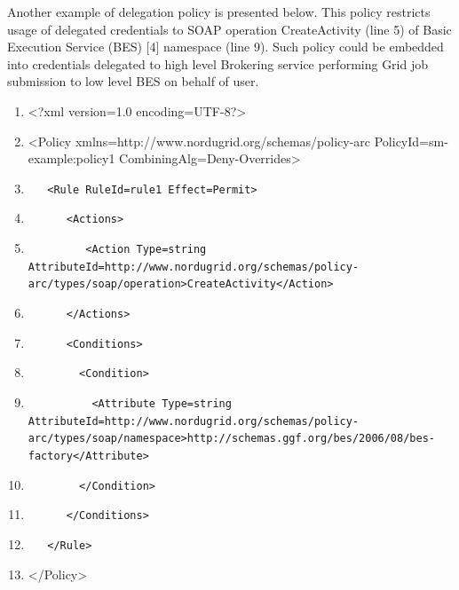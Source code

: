 \documentclass{article}
\newcommand\liststyleWWviiiNumxvi{%
\renewcommand\theenumi{\arabic{enumi}}
\renewcommand\theenumii{\arabic{enumii}}
\renewcommand\theenumiii{\arabic{enumiii}}
\renewcommand\theenumiv{\arabic{enumiv}}
\renewcommand\labelenumi{\theenumi.}
\renewcommand\labelenumii{\theenumii.}
\renewcommand\labelenumiii{\theenumiii.}
\renewcommand\labelenumiv{\theenumiv.}
}
\begin{document}
{\color{black}
Another example of delegation policy is presented below. This policy
restricts usage of delegated credentials to SOAP operation
CreateActivity (line 5) of Basic Execution Service (BES) [4] namespace
(line 9). Such policy could be embedded into credentials delegated to
high level Brokering service performing Grid job submission to low
level BES on behalf of user.}

\liststyleWWviiiNumxvi
\begin{enumerate}
\item {\ttfamily\color{black}
{\textless}?xml version={\textquotedbl}1.0{\textquotedbl}
encoding={\textquotedbl}UTF-8{\textquotedbl}?{\textgreater}}
\item {\ttfamily\color{black}
{\textless}Policy
xmlns={\textquotedbl}http://www.nordugrid.org/schemas/policy-arc{\textquotedbl}
PolicyId={\textquotedbl}sm-example:policy1{\textquotedbl}
CombiningAlg={\textquotedbl}Deny-Overrides{\textquotedbl}{\textgreater}}
\item {\color{black}
\texttt{\ \ \ {\textless}Rule RuleId={\textquotedbl}rule1{\textquotedbl}
Effect={\textquotedbl}Permit{\textquotedbl}{\textgreater}}}
\item {\color{black}
\texttt{\ \ \ \ \ \ {\textless}Actions{\textgreater}}}
\item {\color{black}
\texttt{\ \ \ \ \ \ \ \ \ {\textless}Action
Type={\textquotedbl}string{\textquotedbl}
AttributeId={\textquotedbl}http://www.nordugrid.org/schemas/policy-arc/types/soap/operation{\textquotedbl}{\textgreater}CreateActivity{\textless}/Action{\textgreater}}}
\item {\color{black}
\texttt{\ \ \ \ \ \ {\textless}/Actions{\textgreater}}}
\item {\color{black}
\texttt{\ \ \ \ \ \ {\textless}Conditions{\textgreater}}}
\item {\color{black}
\texttt{\ \ \ \ \ \ \ \ {\textless}Condition{\textgreater}}}
\item {\color{black}
\texttt{\ \ \ \ \ \ \ \ \ \ {\textless}Attribute
Type={\textquotedbl}string{\textquotedbl}
AttributeId={\textquotedbl}http://www.nordugrid.org/schemas/policy-arc/types/soap/namespace{\textquotedbl}{\textgreater}http://schemas.ggf.org/bes/2006/08/bes-factory{\textless}/Attribute{\textgreater}}}
\item {\color{black}
\texttt{\ \ \ \ \ \ \ \ {\textless}/Condition{\textgreater}}}
\item {\color{black}
\texttt{\ \ \ \ \ \ {\textless}/Conditions{\textgreater}}}
\item {\color{black}
\texttt{\ \ \ {\textless}/Rule{\textgreater}}}
\item {\ttfamily\color{black}
{\textless}/Policy{\textgreater}}
\end{enumerate}
\end{document}
